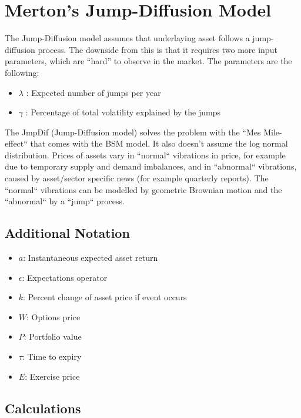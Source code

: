 \documentclass{article}
\begin{document}
\section{Merton's Jump-Diffusion Model}
The Jump-Diffusion model \cite{Kou_2007} \cite{mert} assumes that underlaying asset follows a jump-diffusion process. The downside from this is that it requires two more input parameters, which are “hard” to observe in the market. The parameters are the following:
\begin{itemize}
    \item $\lambda$ : Expected number of jumps per year
    \item $\gamma$ : Percentage of total volatility explained by the jumps
\end{itemize}
The JmpDif (Jump-Diffusion model) solves the problem with the “Mes Mile-effect“ that comes with the BSM model. It also doesn’t assume the log normal distribution. Prices of assets vary in “normal“ vibrations in price, for example due to temporary supply and demand imbalances, and in “abnormal“ vibrations, caused by asset/sector specific news (for example quarterly reports). The “normal“ vibrations can be modelled by geometric Brownian motion and the “abnormal“ by a “jump“ process.
\subsection{Additional Notation}
\begin{itemize}
    \item $a$: Instantaneous expected asset return
    \item $\epsilon$: Expectations operator
    \item $k$: Percent change of asset price if event occurs
    \item $W$: Options price
    \item $P$: Portfolio value
    \item $\tau$: Time to expiry
    \item $E$: Exercise price
\end{itemize}
\subsection{Calculations}
\end{document}
